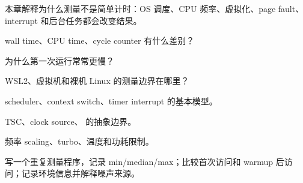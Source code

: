 {本章解释为什么测量不是简单计时：OS 调度、CPU 频率、虚拟化、page fault、interrupt 和后台任务都会改变结果。}
{\item wall time、CPU time、cycle counter 有什么差别？
\item 为什么第一次运行常常更慢？
\item WSL2、虚拟机和裸机 Linux 的测量边界在哪里？}
{\item scheduler、context switch、timer interrupt 的基本模型。
\item TSC、clock source、 的抽象边界。
\item 频率 scaling、turbo、温度和功耗限制。}
{写一个重复测量程序，记录 min/median/max；比较首次访问和 warmup 后访问；记录环境信息并解释噪声来源。}
